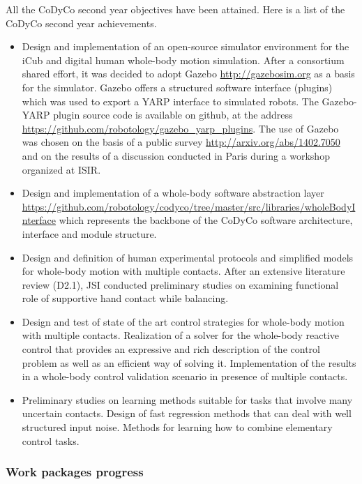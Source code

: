 \documentclass[12pt,a4paper,twoside]{article}
\begin{document}
All the CoDyCo second year objectives have been attained. Here is a list of the CoDyCo second year achievements. 
\begin{itemize}

\item Design and implementation of an open-source simulator environment for the iCub and digital human whole-body motion simulation. After a consortium shared effort, it was decided to adopt Gazebo \url{http://gazebosim.org} as a basis for the simulator. Gazebo offers a structured software interface (plugins) which was used to export a YARP interface to simulated robots. The Gazebo-YARP plugin source code is available on github, at the address \url{https://github.com/robotology/gazebo_yarp_plugins}. The use of Gazebo was chosen on the basis of a public survey \url{http://arxiv.org/abs/1402.7050} and on the results of a discussion conducted in Paris during a workshop organized at ISIR.

\item Design and implementation of a whole-body software abstraction layer \url{https://github.com/robotology/codyco/tree/master/src/libraries/wholeBodyInterface} which represents the backbone of the CoDyCo software architecture, interface and module structure.

\item Design and definition of human experimental protocols and simplified models for whole-body motion with multiple contacts. After an extensive literature review (D2.1), JSI conducted preliminary studies on examining functional role of supportive hand contact while balancing.

\item Design and test of state of the art control strategies for whole-body motion with multiple contacts. Realization of a solver for the whole-body reactive control that provides an expressive and rich description of the control problem as well as an efficient way of solving it. Implementation of the results in a whole-body control validation scenario in presence of multiple contacts. 

\item Preliminary studies on learning methods suitable for tasks that involve many uncertain contacts. Design of fast regression methods that can deal with well structured input noise. Methods for learning how to combine elementary control tasks.

\end{itemize}

\subsubsection{Work packages progress}
\end{document}
